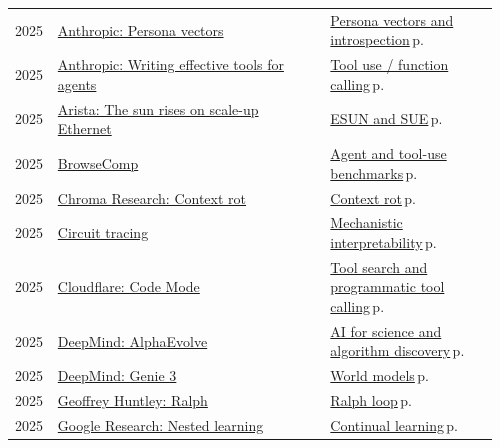 \documentclass[10pt,a4paper,openany]{report}
\begin{document}
{\begin{longtable}{@{}p{0.07\linewidth}>{\raggedright}p{0.55\linewidth}>{\raggedright\arraybackslash}p{0.34\linewidth}@{}}
2025 & \href{https://www.anthropic.com/research/persona-vectors}{Anthropic: Persona vectors} & \hyperref[c:safety-7]{Persona vectors and introspection}\,{\color{muted}\scriptsize p.\,\pageref{c:safety-7}}\\
2025 & \href{https://www.anthropic.com/engineering/writing-tools-for-agents}{Anthropic: Writing effective tools for agents} & \hyperref[c:agents-5]{Tool use / function calling}\,{\color{muted}\scriptsize p.\,\pageref{c:agents-5}}\\
2025 & \href{https://blogs.arista.com/blog/the-sun-rises-on-scale-up-ethernet}{Arista: The sun rises on scale-up Ethernet} & \hyperref[c:hardware-4]{ESUN and SUE}\,{\color{muted}\scriptsize p.\,\pageref{c:hardware-4}}\\
2025 & \href{https://openai.com/index/browsecomp/}{BrowseComp} & \hyperref[c:evals-5]{Agent and tool-use benchmarks}\,{\color{muted}\scriptsize p.\,\pageref{c:evals-5}}\\
2025 & \href{https://research.trychroma.com/context-rot}{Chroma Research: Context rot} & \hyperref[c:context-1]{Context rot}\,{\color{muted}\scriptsize p.\,\pageref{c:context-1}}\\
2025 & \href{https://transformer-circuits.pub/2025/attribution-graphs/methods.html}{Circuit tracing} & \hyperref[c:safety-6]{Mechanistic interpretability}\,{\color{muted}\scriptsize p.\,\pageref{c:safety-6}}\\
2025 & \href{https://blog.cloudflare.com/code-mode/}{Cloudflare: Code Mode} & \hyperref[c:agents-6]{Tool search and programmatic tool calling}\,{\color{muted}\scriptsize p.\,\pageref{c:agents-6}}\\
2025 & \href{https://deepmind.google/discover/blog/alphaevolve-a-gemini-powered-coding-agent-for-designing-advanced-algorithms/}{DeepMind: AlphaEvolve} & \hyperref[c:embodied-7]{AI for science and algorithm discovery}\,{\color{muted}\scriptsize p.\,\pageref{c:embodied-7}}\\
2025 & \href{https://deepmind.google/discover/blog/genie-3-a-new-frontier-for-world-models/}{DeepMind: Genie 3} & \hyperref[c:embodied-2]{World models}\,{\color{muted}\scriptsize p.\,\pageref{c:embodied-2}}\\
2025 & \href{https://ghuntley.com/ralph/}{Geoffrey Huntley: Ralph} & \hyperref[c:coding-4]{Ralph loop}\,{\color{muted}\scriptsize p.\,\pageref{c:coding-4}}\\
2025 & \href{https://research.google/blog/introducing-nested-learning-a-new-ml-paradigm-for-continual-learning/}{Google Research: Nested learning} & \hyperref[c:reasoning-11]{Continual learning}\,{\color{muted}\scriptsize p.\,\pageref{c:reasoning-11}}\\

\end{longtable}}
\end{document}
